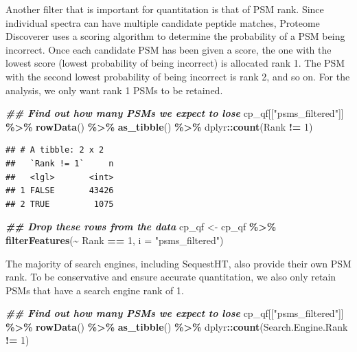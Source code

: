 \documentclass[9pt,a4paper,]{extarticle}
\newenvironment{Shaded}{\begin{snugshade}}{\end{snugshade}}
\newcommand{\AttributeTok}[1]{\textcolor[rgb]{0.13,0.29,0.53}{#1}}
\newcommand{\DecValTok}[1]{\textcolor[rgb]{0.00,0.00,0.81}{#1}}
\newcommand{\DocumentationTok}[1]{\textcolor[rgb]{0.56,0.35,0.01}{\textbf{\textit{#1}}}}
\newcommand{\FunctionTok}[1]{\textcolor[rgb]{0.13,0.29,0.53}{\textbf{#1}}}
\newcommand{\NormalTok}[1]{#1}
\newcommand{\OtherTok}[1]{\textcolor[rgb]{0.56,0.35,0.01}{#1}}
\newcommand{\SpecialCharTok}[1]{\textcolor[rgb]{0.81,0.36,0.00}{\textbf{#1}}}
\newcommand{\StringTok}[1]{\textcolor[rgb]{0.31,0.60,0.02}{#1}}
\begin{document}
Another filter that is important for quantitation is that of PSM rank. Since
individual spectra can have multiple candidate peptide matches, Proteome
Discoverer uses a scoring algorithm to determine the probability of a PSM being
incorrect. Once each candidate PSM has been given a score, the one with the
lowest score (lowest probability of being incorrect) is allocated rank 1. The PSM
with the second lowest probability of being incorrect is rank 2, and so on. For
the analysis, we only want rank 1 PSMs to be retained.

\begin{Shaded}
\begin{Highlighting}[]
\DocumentationTok{\#\# Find out how many PSMs we expect to lose}
\NormalTok{cp\_qf[[}\StringTok{"psms\_filtered"}\NormalTok{]] }\SpecialCharTok{\%\textgreater{}\%} 
  \FunctionTok{rowData}\NormalTok{() }\SpecialCharTok{\%\textgreater{}\%} 
  \FunctionTok{as\_tibble}\NormalTok{() }\SpecialCharTok{\%\textgreater{}\%} 
\NormalTok{  dplyr}\SpecialCharTok{::}\FunctionTok{count}\NormalTok{(Rank }\SpecialCharTok{!=} \DecValTok{1}\NormalTok{)}
\end{Highlighting}
\end{Shaded}

\begin{verbatim}
## # A tibble: 2 x 2
##   `Rank != 1`     n
##   <lgl>       <int>
## 1 FALSE       43426
## 2 TRUE         1075
\end{verbatim}

\begin{Shaded}
\begin{Highlighting}[]
\DocumentationTok{\#\# Drop these rows from the data}
\NormalTok{cp\_qf }\OtherTok{\textless{}{-}}\NormalTok{ cp\_qf }\SpecialCharTok{\%\textgreater{}\%}
  \FunctionTok{filterFeatures}\NormalTok{(}\SpecialCharTok{\textasciitilde{}}\NormalTok{ Rank }\SpecialCharTok{==} \DecValTok{1}\NormalTok{,}
                 \AttributeTok{i =} \StringTok{"psms\_filtered"}\NormalTok{)}
\end{Highlighting}
\end{Shaded}

The majority of search engines, including SequestHT, also provide their own PSM
rank. To be conservative and ensure accurate quantitation, we also only retain
PSMs that have a search engine rank of 1.

\begin{Shaded}
\begin{Highlighting}[]
\DocumentationTok{\#\# Find out how many PSMs we expect to lose}
\NormalTok{cp\_qf[[}\StringTok{"psms\_filtered"}\NormalTok{]] }\SpecialCharTok{\%\textgreater{}\%} 
  \FunctionTok{rowData}\NormalTok{() }\SpecialCharTok{\%\textgreater{}\%} 
  \FunctionTok{as\_tibble}\NormalTok{() }\SpecialCharTok{\%\textgreater{}\%} 
\NormalTok{  dplyr}\SpecialCharTok{::}\FunctionTok{count}\NormalTok{(Search.Engine.Rank }\SpecialCharTok{!=} \DecValTok{1}\NormalTok{)}
\end{Highlighting}
\end{Shaded}
\end{document}
